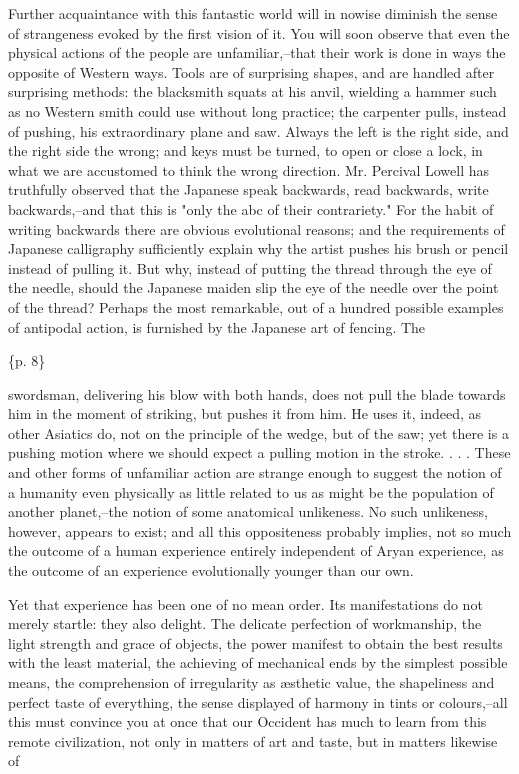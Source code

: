 Further acquaintance with this fantastic world will in nowise diminish the sense of strangeness evoked by the first vision of it. You will soon observe that even the physical actions of the people are unfamiliar,--that their work is done in ways the opposite of Western ways. Tools are of surprising shapes, and are handled after surprising methods: the blacksmith squats at his anvil, wielding a hammer such as no Western smith could use without long practice; the carpenter pulls, instead of pushing, his extraordinary plane and saw. Always the left is the right side, and the right side the wrong; and keys must be turned, to open or close a lock, in what we are accustomed to think the wrong direction. Mr. Percival Lowell has truthfully observed that the Japanese speak backwards, read backwards, write backwards,--and that this is "only the abc of their contrariety." For the habit of writing backwards there are obvious evolutional reasons; and the requirements of Japanese calligraphy sufficiently explain why the artist pushes his brush or pencil instead of pulling it. But why, instead of putting the thread through the eye of the needle, should the Japanese maiden slip the eye of the needle over the point of the thread? Perhaps the most remarkable, out of a hundred possible examples of antipodal action, is furnished by the Japanese art of fencing. The

\{p. 8\}

swordsman, delivering his blow with both hands, does not pull the blade towards him in the moment of striking, but pushes it from him. He uses it, indeed, as other Asiatics do, not on the principle of the wedge, but of the saw; yet there is a pushing motion where we should expect a pulling motion in the stroke. . . . These and other forms of unfamiliar action are strange enough to suggest the notion of a humanity even physically as little related to us as might be the population of another planet,--the notion of some anatomical unlikeness. No such unlikeness, however, appears to exist; and all this oppositeness probably implies, not so much the outcome of a human experience entirely independent of Aryan experience, as the outcome of an experience evolutionally younger than our own.

Yet that experience has been one of no mean order. Its manifestations do not merely startle: they also delight. The delicate perfection of workmanship, the light strength and grace of objects, the power manifest to obtain the best results with the least material, the achieving of mechanical ends by the simplest possible means, the comprehension of irregularity as æsthetic value, the shapeliness and perfect taste of everything, the sense displayed of harmony in tints or colours,--all this must convince you at once that our Occident has much to learn from this remote civilization, not only in matters of art and taste, but in matters likewise of

